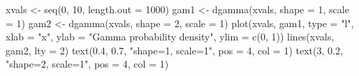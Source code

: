 \begin{Schunk}
\begin{Sinput}
 xvals <- seq(0, 10, length.out = 1000)
 gam1 <- dgamma(xvals, shape = 1, scale = 1)
 gam2 <- dgamma(xvals, shape = 2, scale = 1)
 plot(xvals, gam1, type = "l", xlab = "x", ylab = "Gamma probability density", 
      ylim = c(0, 1))
 lines(xvals, gam2, lty = 2)
 text(0.4, 0.7, "shape=1, scale=1", pos = 4, col = 1)
 text(3, 0.2, "shape=2, scale=1", pos = 4, col = 1)
\end{Sinput}
\end{Schunk}
